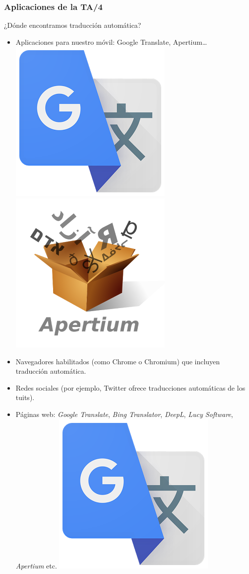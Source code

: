 \documentclass{beamer}
\begin{document}
\begin{frame}
\frametitle{Aplicaciones de la TA/4}
¿Dónde encontramos traducción automática?\pause
\begin{itemize}
\item Aplicaciones para nuestro móvil: Google Translate, Apertium\ldots
\includegraphics[scale=0.09]{googletranslate.png}
\includegraphics[scale=0.11]{apertium.png}\pause
\item Navegadores habilitados (como Chrome o Chromium) que incluyen traducción automática.\pause
\item Redes sociales (por ejemplo, Twitter ofrece traducciones automáticas de los tuits).\pause
\item Páginas web: \emph{Google Translate}, \emph{Bing Translator}, \emph{DeepL}, \emph{Lucy Software}, \emph{Apertium} etc.
\includegraphics[scale=0.09]{googletranslate.png}

\end{itemize}
\end{frame}
\end{document}
